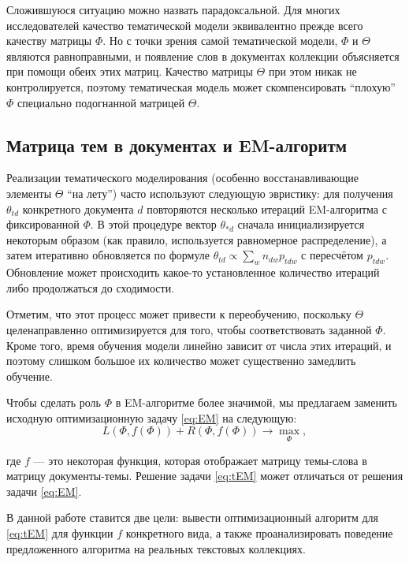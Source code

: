 Сложившуюся ситуацию можно назвать парадоксальной. Для многих исследователей качество тематической модели эквивалентно прежде всего качеству матрицы $\Phi$. Но с точки зрения самой тематической модели, $\Phi$ и $\Theta$ являются равноправными, и появление слов в документах коллекции объясняется при помощи обеих этих матриц. Качество матрицы $\Theta$ при этом никак не контролируется, поэтому тематическая модель может скомпенсировать ``плохую'' $\Phi$ специально подогнанной матрицей $\Theta$.

\subsection{Матрица тем в документах и EM-алгоритм}
\label{sec:theta_inference}

Реализации тематического моделирования (особенно  восстанавливающие элементы $\Theta$ ``на лету'') часто используют следующую эвристику: для получения $\theta_{td}$ конкретного документа $d$ повторяются несколько итераций EM-алгоритма с фиксированной $\Phi$. В этой процедуре вектор $\theta_{\ast d}$ сначала инициализируется некоторым образом (как правило, используется равномерное распределение), а затем итеративно обновляется по формуле $\theta_{td}  \propto \sum_{w} n_{dw} p_{tdw}$ с пересчётом $p_{tdw}$. Обновление может происходить какое-то установленное количество итераций либо продолжаться до сходимости.

Отметим, что этот процесс может привести к переобучению, поскольку $\Theta$ целенаправленно оптимизируется для того, чтобы соответствовать заданной $\Phi$. Кроме того, время обучения модели линейно зависит от числа этих итераций, и поэтому слишком большое их количество может существенно замедлить обучение.

Чтобы сделать роль $\Phi$ в EM-алгоритме более значимой, мы предлагаем заменить исходную оптимизационную задачу \ref{eq:EM} на следующую:
\begin{equation} \label{eq:tEM}
L(\Phi, f(\Phi) ) + R(\Phi, f(\Phi) ) \to \max_{\Phi},
\end{equation}

где $f$ --- это некоторая функция, которая отображает матрицу темы-слова в матрицу документы-темы. Решение задачи \ref{eq:tEM} может отличаться от решения задачи \ref{eq:EM}.

В данной работе ставится две цели: вывести оптимизационный алгоритм для \ref{eq:tEM} для функции $f$ конкретного вида, а также проанализировать поведение предложенного алгоритма на реальных текстовых коллекциях.

